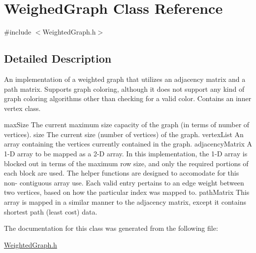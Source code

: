 \hypertarget{class_weighed_graph}{\section{\-Weighed\-Graph \-Class \-Reference}
\label{class_weighed_graph}
}


{\ttfamily \#include $<$\-Weighted\-Graph.\-h$>$}



\subsection{\-Detailed \-Description}
\-An implementation of a weighted graph that utilizes an adjacency matrix and a path matrix. \-Supports graph coloring, although it does not support any kind of graph coloring algorithms other than checking for a valid color. \-Contains an inner vertex class.

max\-Size \-The current maximum size capacity of the graph (in terms of number of vertices).  size \-The current size (number of vertices) of the graph.  vertex\-List \-An array containing the vertices currently contained in the graph.  adjacency\-Matrix \-A 1-\/\-D array to be mapped as a 2-\/\-D array. \-In this implementation, the 1-\/\-D array is blocked out in terms of the maximum row size, and only the required portions of each block are used. \-The helper functions are designed to accomodate for this non-\/ contiguous array use. \-Each valid entry pertains to an edge weight between two vertices, based on how the particular index was mapped to.  path\-Matrix \-This array is mapped in a similar manner to the adjacency matrix, except it contains shortest path (least cost) data. 

\-The documentation for this class was generated from the following file\-:\begin{DoxyCompactItemize}
\item 
\hyperlink{_weighted_graph_8h}{\-Weighted\-Graph.\-h}\end{DoxyCompactItemize}
